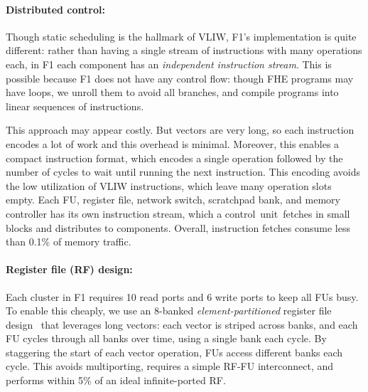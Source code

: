 \paragraph{Distributed control:}
Though static scheduling is the hallmark of VLIW, F1's implementation is quite
different: rather than having a single stream of instructions with many
operations each, in F1 each component has an \emph{independent instruction
stream}. This is possible because F1 does not have any control flow: though FHE
programs may have loops, we unroll them to avoid all branches, and compile
programs into linear sequences of instructions.

This approach may appear costly. But vectors are very long, so each instruction
encodes a lot of work and this overhead is minimal. Moreover, this enables a
compact instruction format, which encodes a single operation followed by the
number of cycles to wait until running the next instruction. This encoding
avoids the low utilization of VLIW instructions, which leave many operation
slots empty. Each FU, register file, network switch, scratchpad bank, and
memory controller has its own instruction stream, which a control~unit~fetches
in small blocks and distributes to components. Overall, instruction fetches
consume less than 0.1\% of memory traffic.

\paragraph{Register file (RF) design:}
Each cluster in F1 requires 10 read ports and 6 write ports to keep all FUs
busy. To enable this cheaply, we use an 8-banked \emph{element-partitioned}
register file design~\cite{asanovic:ucb98:vector} that leverages long vectors:
each vector is striped across banks, and each FU cycles through all banks over
time, using a single bank each cycle. By staggering the start of each vector
operation, FUs access different banks each cycle. This avoids multiporting,
requires a simple RF-FU interconnect, and performs within 5\% of an ideal
infinite-ported RF.
